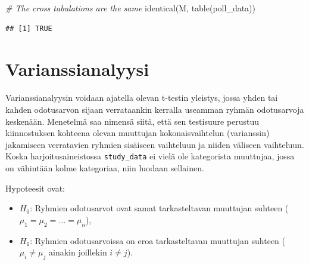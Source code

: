 \documentclass[
]{book}
\newenvironment{Shaded}{\begin{snugshade}}{\end{snugshade}}
\newcommand{\CommentTok}[1]{\textcolor[rgb]{0.56,0.35,0.01}{\textit{#1}}}
\newcommand{\FunctionTok}[1]{\textcolor[rgb]{0.00,0.00,0.00}{#1}}
\newcommand{\NormalTok}[1]{#1}
\newcommand{\OtherTok}[1]{\textcolor[rgb]{0.56,0.35,0.01}{#1}}
\newcommand{\SpecialCharTok}[1]{\textcolor[rgb]{0.00,0.00,0.00}{#1}}
\newcommand{\StringTok}[1]{\textcolor[rgb]{0.31,0.60,0.02}{#1}}
\providecommand{\tightlist}{%
  \setlength{\itemsep}{0pt}\setlength{\parskip}{0pt}}
\begin{document}
\begin{Shaded}
\begin{Highlighting}[]
\CommentTok{\# The cross tabulations are the same}
\FunctionTok{identical}\NormalTok{(M, }\FunctionTok{table}\NormalTok{(poll\_data))}
\end{Highlighting}
\end{Shaded}

\begin{verbatim}
## [1] TRUE
\end{verbatim}

\hypertarget{anova}{%
\section{Varianssianalyysi}\label{anova}}

Varianssianalyysin voidaan ajatella olevan t-testin yleistys, jossa yhden tai kahden odotusarvon sijaan verrataankin kerralla useamman ryhmän odotusarvoja keskenään. Menetelmä saa nimensä siitä, että sen testisuure perustuu kiinnostuksen kohteena olevan muuttujan kokonaisvaihtelun (varianssin) jakamiseen verratavien ryhmien sisäiseen vaihteluun ja niiden väliseen vaihteluun. Koska harjoitusaineistossa \texttt{study\_data} ei vielä ole kategorista muuttujaa, jossa on vähintään kolme kategoriaa, niin luodaan sellainen.

\begin{Shaded}
\end{Shaded}

Hypoteesit ovat:

\begin{itemize}
\tightlist
\item
  \(H_0\): Ryhmien odotusarvot ovat samat tarkasteltavan muuttujan suhteen (\(\mu_1 = \mu_2 = \dots = \mu_n\)),
\item
  \(H_1\): Ryhmien odotusarvoissa on eroa tarkasteltavan muuttujan suhteen (\(\mu_i \ne \mu_j\) ainakin joillekin \(i \ne j\)).
\end{itemize}
\end{document}
